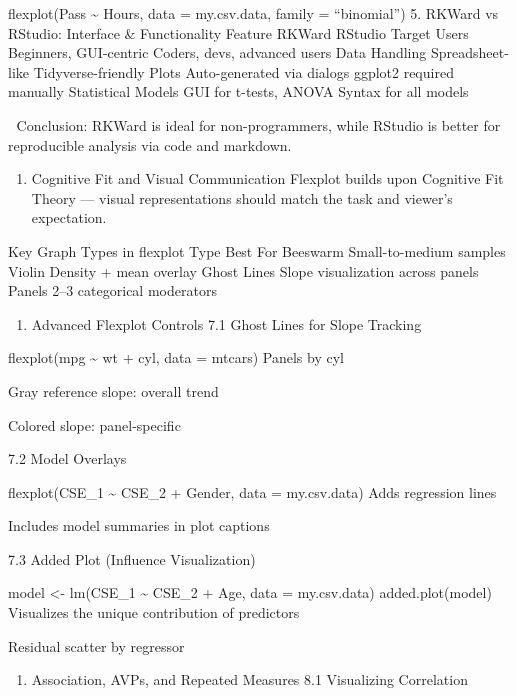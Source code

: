 \documentclass[
  letterpaper,
  DIV=11,
  numbers=noendperiod]{scrreprt}
\providecommand{\tightlist}{%
  \setlength{\itemsep}{0pt}\setlength{\parskip}{0pt}}
\begin{document}
{flexplot(Pass \textasciitilde{} Hours, data = my.csv.data, family =
``binomial'') 5. RKWard vs RStudio: Interface \& Functionality Feature
RKWard RStudio Target Users Beginners, GUI-centric Coders, devs,
advanced users Data Handling Spreadsheet-like Tidyverse-friendly Plots
Auto-generated via dialogs ggplot2 required manually Statistical Models
GUI for t-tests, ANOVA Syntax for all models

🔎 Conclusion: RKWard is ideal for non-programmers, while RStudio is
better for reproducible analysis via code and markdown.

\begin{enumerate}
\def\labelenumi{\arabic{enumi}.}
\setcounter{enumi}{5}
\tightlist
\item
  Cognitive Fit and Visual Communication Flexplot builds upon Cognitive
  Fit Theory --- visual representations should match the task and
  viewer's expectation.
\end{enumerate}

Key Graph Types in flexplot Type Best For Beeswarm Small-to-medium
samples Violin Density + mean overlay Ghost Lines Slope visualization
across panels Panels 2--3 categorical moderators

\begin{enumerate}
\def\labelenumi{\arabic{enumi}.}
\setcounter{enumi}{6}
\tightlist
\item
  Advanced Flexplot Controls 7.1 Ghost Lines for Slope Tracking
\end{enumerate}

flexplot(mpg \textasciitilde{} wt + cyl, data = mtcars) Panels by cyl

Gray reference slope: overall trend

Colored slope: panel-specific

7.2 Model Overlays

flexplot(CSE\_1 \textasciitilde{} CSE\_2 + Gender, data = my.csv.data)
Adds regression lines

Includes model summaries in plot captions

7.3 Added Plot (Influence Visualization)

model \textless- lm(CSE\_1 \textasciitilde{} CSE\_2 + Age, data =
my.csv.data) added.plot(model) Visualizes the unique contribution of
predictors

Residual scatter by regressor

\begin{enumerate}
\def\labelenumi{\arabic{enumi}.}
\setcounter{enumi}{7}
\tightlist
\item
  Association, AVPs, and Repeated Measures 8.1 Visualizing Correlation
\end{enumerate}

}
\end{document}
